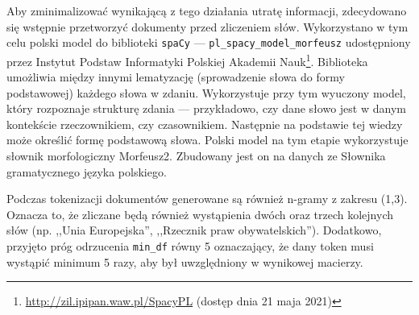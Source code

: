 		Aby zminimalizować wynikającą z tego działania utratę informacji, zdecydowano się wstępnie przetworzyć dokumenty przed zliczeniem słów.
		Wykorzystano w tym celu polski model do biblioteki \verb|spaCy|
			--- \verb|pl_spacy_model_morfeusz|\cite{spacy_pl} udostępniony przez Instytut Podstaw Informatyki Polskiej Akademii Nauk\footnote{\url{http://zil.ipipan.waw.pl/SpacyPL} (dostęp dnia 21 maja 2021)}.
		Biblioteka umożliwia między innymi lematyzację (sprowadzenie słowa do formy podstawowej) każdego słowa w zdaniu.
		Wykorzystuje przy tym wyuczony model, który rozpoznaje strukturę zdania --- przykładowo, czy dane słowo jest w danym kontekście rzeczownikiem, czy czasownikiem.
		Następnie na podstawie tej wiedzy może określić formę podstawową słowa.
		Polski model na tym etapie wykorzystuje słownik morfologiczny Morfeusz2\cite{morfeusz}.
		Zbudowany jest on na danych ze Słownika gramatycznego języka polskiego.

		Podczas tokenizacji dokumentów generowane są również n-gramy z zakresu (1,3).
		Oznacza to, że zliczane będą również wystąpienia dwóch oraz trzech kolejnych słów (np. ,,Unia Europejska'', ,,Rzecznik praw obywatelskich'').
		Dodatkowo, przyjęto próg odrzucenia \verb|min_df| równy 5 oznaczający, że dany token musi wystąpić minimum 5 razy,
			aby był uwzględniony w wynikowej macierzy.
